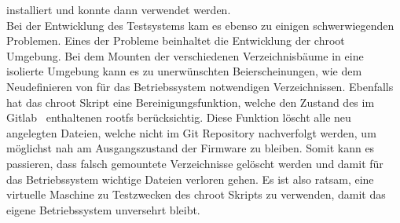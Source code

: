 installiert und konnte dann verwendet werden.\\
\linebreak
Bei der Entwicklung des Testsystems kam es ebenso zu einigen schwerwiegenden Problemen.
Eines der Probleme beinhaltet die Entwicklung der chroot Umgebung.
Bei dem Mounten der verschiedenen Verzeichnisbäume in eine isolierte Umgebung kann es zu unerwünschten Beierscheinungen,
wie dem Neudefinieren von für das Betriebssystem notwendigen Verzeichnissen.
Ebenfalls hat das chroot Skript eine Bereinigungsfunktion, welche den Zustand des im Gitlab~\cite{gitlab} enthaltenen rootfs berücksichtig.
Diese Funktion löscht alle neu angelegten Dateien, welche nicht im Git Repository nachverfolgt werden, um möglichst nah am
Ausgangszustand der Firmware zu bleiben.
Somit kann es passieren, dass falsch gemountete Verzeichnisse gelöscht werden und damit für das Betriebssystem wichtige Dateien
verloren gehen.
Es ist also ratsam, eine virtuelle Maschine zu Testzwecken des chroot Skripts zu verwenden, damit das eigene Betriebssystem
unversehrt bleibt.